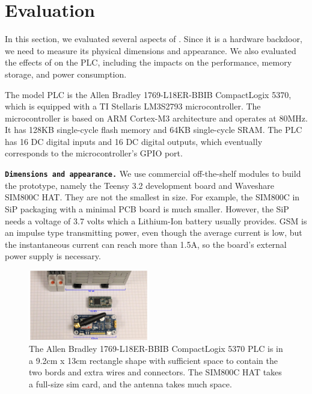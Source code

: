 \section{Evaluation}
\label{sec:implant-evaluation}

In this section, we evaluated several aspects of \name. Since it is a hardware backdoor, we need to measure its physical dimensions and appearance. We also evaluated the effects of \name on the PLC, including the impacts on the performance, memory storage, and power consumption.

The model PLC is the Allen Bradley 1769-L18ER-BBIB CompactLogix
5370, which is equipped with a TI Stellaris LM3S2793 microcontroller. The microcontroller is based on ARM Cortex-M3 architecture and operates at 80MHz. It has 128KB single-cycle flash memory and 64KB single-cycle SRAM. The PLC has 16 DC digital inputs and 16 DC digital outputs, which eventually corresponds to the microcontroller's GPIO port.

\texttt{\textbf{Dimensions and appearance.}} We use commercial off-the-shelf modules to build the prototype, namely the Teensy 3.2 development board and Waveshare SIM800C HAT. They are not the smallest in size. For example,  the SIM800C in SiP packaging with a minimal PCB board is much smaller. However, the SiP needs a voltage of 3.7 volts which a Lithium-Ion battery usually provides. GSM is an impulse type transmitting power, even though the average current is low, but the instantaneous current can reach more than 1.5A, so the board's external power supply is necessary. 

\begin{figure}[h]
	\includegraphics[width=0.47\textwidth]{figures/eval_size}
	\centering
	\caption{The Allen Bradley 1769-L18ER-BBIB CompactLogix
	5370 PLC is in a 9.2cm x 13cm rectangle shape with sufficient space to contain the two bords and extra wires and connectors. The SIM800C HAT takes a full-size sim card, and the antenna takes much space.}
	\label{fig:eval_size}
\end{figure}

